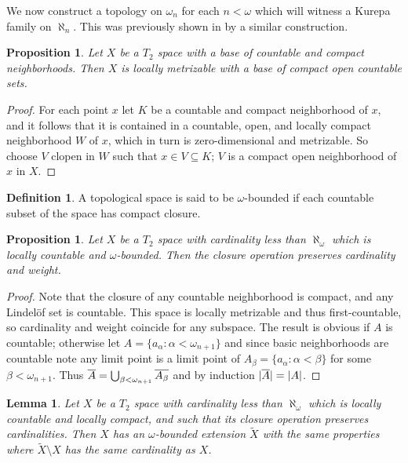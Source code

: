 \documentclass{amsart}
\theoremstyle{plain}
\newtheorem{lemma}[theorem]{Lemma}
\newtheorem{proposition}[theorem]{Proposition}
\theoremstyle{definition}
\newtheorem{definition}[theorem]{Definition}
\theoremstyle{remark}
\theoremstyle{plain}
\theoremstyle{definition}
\theoremstyle{remark}
\begin{document}
  We now construct a topology on \(\omega_n\) for each \(n<\omega\) which
  will witness a Kurepa family on \(\aleph_n\). This was previously shown in
  \cite{MR539228} by a similar construction.

  \begin{proposition}
    Let \(X\) be a \(T_2\) space with a base of countable and compact
    neighborhoods. Then \(X\) is locally metrizable with
    a base of compact open countable sets.
  \end{proposition}

  \begin{proof}
    For each point \(x\) let \(K\) be a countable and compact neighborhood
    of \(x\), and it follows that it is contained in a countable, open,
    and locally compact neighborhood \(W\) of \(x\), which in turn
    is zero-dimensional and metrizable. So choose \(V\) clopen
    in \(W\) such that \(x\in V\subseteq K\); \(V\) is a compact open
    neighborhood of \(x\) in \(X\).
  \end{proof}

  \begin{definition}
    A topological space is said to be \(\omega\)-bounded if each countable
    subset of the space has compact closure.
  \end{definition}

  \begin{proposition}
    Let \(X\) be a \(T_2\) space with cardinality less than \(\aleph_\omega\)
    which is locally countable and
    \(\omega\)-bounded. Then the closure operation preserves cardinality and
    weight.
  \end{proposition}

  \begin{proof}
    Note that the closure of any countable neighborhood is compact, and
    any Lindel\"of set is countable. This space is locally metrizable
    and thus first-countable, so cardinality and weight coincide for any
    subspace. The result is obvious if \(A\) is countable; otherwise
    let \(A=\{a_\alpha:\alpha<\omega_{n+1}\}\) and since basic neighborhoods
    are countable note any limit point is
    a limit point of \(A_\beta=\{a_\alpha:\alpha<\beta\}\)
    for some \(\beta<\omega_{n+1}\).
    Thus \(\overline{A}=\bigcup_{\beta<\omega_{n+1}}\overline{A_\beta}\) and
    by induction \(|\overline{A}|=|A|\).
  \end{proof}

  \begin{lemma}
    Let \(X\) be a \(T_2\) space with cardinality less than \(\aleph_\omega\)
    which is locally countable and locally compact, and such that
    its closure operation preserves cardinalities.
    Then \(X\) has an \(\omega\)-bounded extension \(\tilde X\)
    with the same properties where \(\tilde X\setminus X\) has the same
    cardinality as \(X\).
  \end{lemma}
\end{document}
